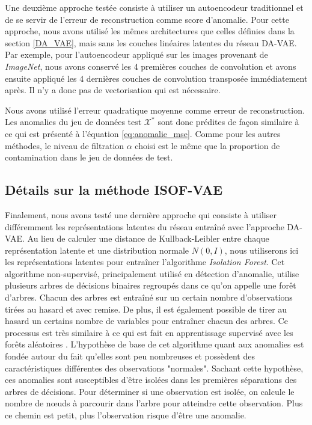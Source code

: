 Une deuxième approche testée consiste à utiliser un autoencodeur traditionnel et de se servir de l'erreur de reconstruction comme score d'anomalie. Pour cette approche, nous avons utilisé les mêmes architectures que celles définies dans la section \ref{DA_VAE}, mais sans les couches linéaires latentes du réseau DA-VAE. Par exemple, pour l'autoencodeur appliqué sur les images provenant de \textit{ImageNet}, nous avons conservé les 4 premières couches de convolution et avons ensuite appliqué les 4 dernières couches de convolution transposée immédiatement après. Il n'y a donc pas de vectorisation qui est nécessaire. 

Nous avons utilisé l'erreur quadratique moyenne comme erreur de reconstruction. Les anomalies du jeu de données test $\mathcal{X^*}$ sont donc prédites de façon similaire à ce qui est présenté à l'équation \ref{eq:anomalie_mse}. Comme pour les autres méthodes, le niveau de filtration $\alpha$ choisi est le même que la proportion de contamination dans le jeu de données de test. 

\subsection{Détails sur la méthode ISOF-VAE} \label{isof_vae}

Finalement, nous avons testé une dernière approche qui consiste à utiliser différemment les représentations latentes du réseau entraîné avec l'approche DA-VAE. Au lieu de calculer une distance de Kullback-Leibler entre chaque représentation latente et une distribution normale $N(0,I)$, nous utiliserons ici les représentations latentes pour entraîner l'algorithme \textit{Isolation Forest}. Cet algorithme non-supervisé, principalement utilisé en détection d'anomalie, utilise plusieurs arbres de décisions binaires regroupés dans ce qu'on appelle une forêt d'arbres. Chacun des arbres est entraîné sur un certain nombre d'observations tirées au hasard et avec remise. De plus, il est également possible de tirer au hasard un certains nombre de variables pour entraîner chacun des arbres. Ce processus est très similaire à ce qui est fait en apprentissage supervisé avec les forêts aléatoires \citep{Statistics01randomforests}. L'hypothèse de base de cet algorithme quant aux anomalies est fondée autour du fait qu'elles sont peu nombreuses et possèdent des caractéristiques différentes des observations "normales". Sachant cette hypothèse, ces anomalies sont susceptibles d'être isolées dans les premières séparations des arbres de décisions. Pour déterminer si une observation est isolée, on calcule le nombre de nœuds à parcourir dans l'arbre pour atteindre cette observation. Plus ce chemin est petit, plus l'observation risque d'être une anomalie.

